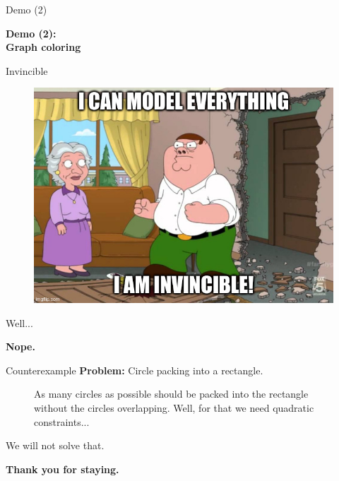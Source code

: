 \documentclass[10pt]{beamer}
\newcommand{\primaryColorB}[1]{\textcolor{mpigreen}{\textbf{#1}}}
\begin{document}
\begin{frame}{Demo (2)}

\begin{center}
	\Huge \primaryColorB{Demo (2):\\ Graph coloring}
\end{center}
\end{frame}

\begin{frame}{Invincible}

\begin{figure}
	\centering
	\includegraphics[scale=0.4]{model_everything.jpeg}
\end{figure}
\end{frame}

\begin{frame}{Well...}

\begin{center}
	\Huge \primaryColorB{Nope.}
\end{center}
\end{frame}

\newcommand{\circleNode}[2]{\node[state, mpigreen,minimum size=1cm] (x5) at (#1,#2) {};}
\begin{frame}{Counterexample}
\primaryColorB{Problem:} Circle packing into a rectangle.
\begin{figure}
	\centering
	\circlePacking
	\caption{As many circles as possible should be packed into the rectangle  without the circles overlapping. Well, for that we need quadratic constraints...}
\end{figure}
\end{frame}


\begin{frame}{We will not solve that.}

\begin{center}
	\Huge \primaryColorB{Thank you for staying.}
\end{center}
\end{frame}
\end{document}
